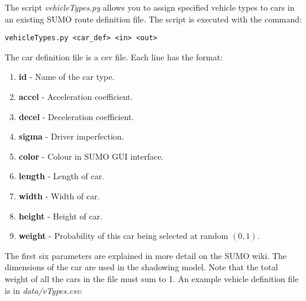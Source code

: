 The script \textit{vehicleTypes.py} allows you to assign specified vehicle types to cars in an existing SUMO route definition file. The script is executed with the command:
\begin{lstlisting}[frame=single]
 vehicleTypes.py <car_def> <in> <out>
\end{lstlisting}
The car definition file is a csv file. Each line has the format:
\begin{enumerate}
 \item \textbf{id} - Name of the car type.
 \item \textbf{accel} - Acceleration coefficient.
 \item \textbf{decel} - Deceleration coefficient.
 \item \textbf{sigma} - Driver imperfection.
 \item \textbf{color} - Colour in SUMO GUI interface.
 \item \textbf{length} - Length of car.
 \item \textbf{width} - Width of car.
 \item \textbf{height} - Height of car.
 \item \textbf{weight} - Probability of this car being selected at random $(0,1)$. 
\end{enumerate}
The first six parameters are explained in more detail on the SUMO wiki. The dimensions of the car are used in the shadowing model. Note that the total weight of all the cars in the file must sum to 1. An example vehicle definition file is in \textit{data/vTypes.csv}.

